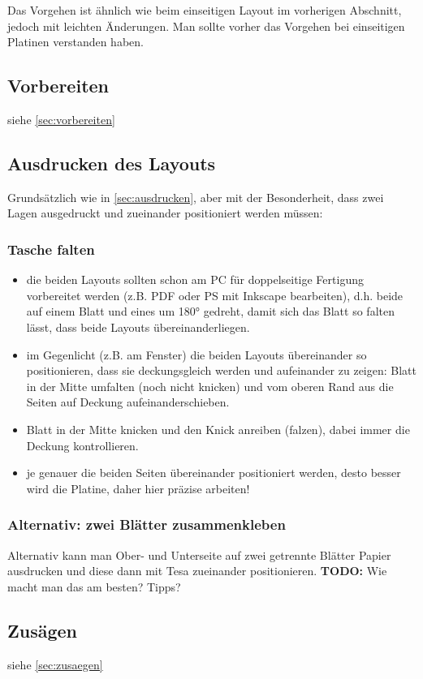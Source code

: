 \documentclass{\basedir/fablab-document}
\begin{document}
Das Vorgehen ist ähnlich wie beim einseitigen Layout im vorherigen Abschnitt, jedoch mit leichten Änderungen. Man sollte vorher das Vorgehen bei einseitigen Platinen verstanden haben.
\secttoc

\subsection{Vorbereiten}
siehe \ref{sec:vorbereiten}

\subsection{Ausdrucken des Layouts}
Grundsätzlich wie in \ref{sec:ausdrucken}, aber mit der Besonderheit, dass zwei Lagen ausgedruckt und zueinander positioniert werden müssen:

\subsubsection{Tasche falten}
\begin{itemize}
\item die beiden Layouts sollten schon am PC für doppelseitige Fertigung vorbereitet werden (z.B. PDF oder PS mit Inkscape bearbeiten), d.h. beide auf einem Blatt und eines um 180° gedreht, damit sich das Blatt so falten lässt, dass beide Layouts übereinanderliegen.
\item im Gegenlicht (z.B. am Fenster) die beiden Layouts übereinander so positionieren, dass sie deckungsgleich werden und aufeinander zu zeigen: Blatt in der Mitte umfalten (noch nicht knicken) und vom oberen Rand aus die Seiten auf Deckung aufeinanderschieben.
\item Blatt in der Mitte knicken und den Knick anreiben (falzen), dabei immer die Deckung kontrollieren.
\item je genauer die beiden Seiten übereinander positioniert werden, desto besser wird die Platine, daher hier präzise arbeiten!
\end{itemize}
\subsubsection{Alternativ: zwei Blätter zusammenkleben}
Alternativ kann man Ober- und Unterseite auf zwei getrennte Blätter Papier ausdrucken und diese dann mit Tesa zueinander positionieren. \textbf{TODO:} Wie macht man das am besten? Tipps?

\subsection{Zusägen}
siehe \ref{sec:zusaegen}
\end{document}

